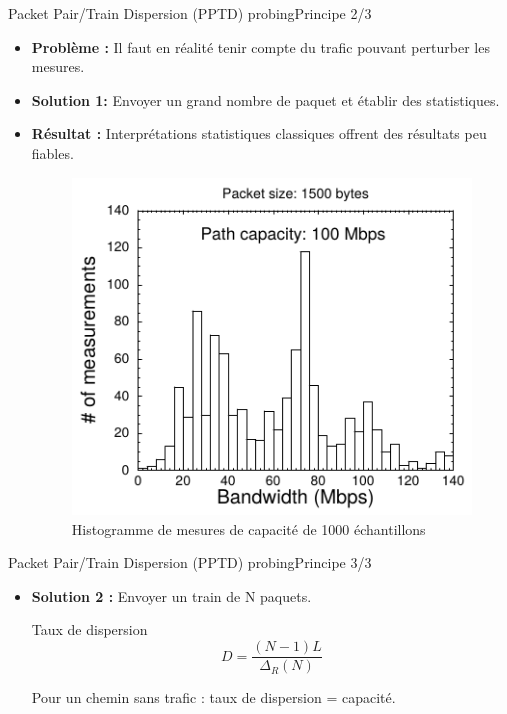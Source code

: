 \documentclass[compress]{beamer}
\begin{document}
\begin{frame}{Packet Pair/Train Dispersion (PPTD) probing}{Principe 2/3}
\begin{itemize}
	\item \textbf{Problème :} Il faut en réalité tenir compte du {\color{red}trafic} pouvant {\color{red}perturber} les mesures.
	\item \textbf{Solution 1:} Envoyer un {\color{red}grand nombre} de paquet et établir des statistiques.
	\item \textbf{Résultat :} Interprétations statistiques classiques offrent des résultats peu fiables. 
	\begin{figure}[hbtp]
		\centering
		\includegraphics[scale=0.4]{schema6.png}
		\caption{Histogramme de mesures de capacité de 1000 échantillons}
	\end{figure}
\end{itemize}
\end{frame}


\begin{frame}{Packet Pair/Train Dispersion (PPTD) probing}{Principe 3/3}
\begin{itemize}
	\item \textbf{Solution 2 :} Envoyer un {\color{red}train de N paquets}.
	\begin{block}{Taux de dispersion}
		$$ D = \frac{(N-1)L}{\Delta_R(N)}$$
	\end{block}
	Pour un chemin sans trafic : taux de dispersion = capacité.
\end{itemize}
\end{frame}
\end{document}

